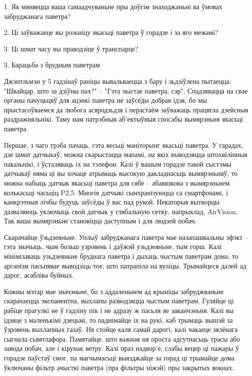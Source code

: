 1. Як мяняецца ваша самаадчуваньне пры доўгім знаходжаньні ва ўмовах забруджанага паветра?

2. Ці заўважаеце вы розьніцу якасьці паветра ў горадзе і за яго межамі?

3. Ці шмат часу вы праводзіце ў транспарце?


3. Барацьба з брудным паветрам

Джэнтльмэн у 5 гадзінаў раніцы вывальваецца з бару і зьдзіўлена пытаецца: "Швайцар, што за дзіўны пах?" – "Гэта чыстае паветра, сэр". Спадзявацца на свае органы пачуцьцяў для ацэнкі паветра не заўсёды добрая ідэя, бо мы прыстасоўваемся да любога асяродзьдзя і перастаём заўважаць працягла дзейсныя раздражняльнікі. Таму нам патрэбныя аб'ектыўныя спосабы вымярэньня якасьці паветра.

Першае, з чаго трэба пачаць, гэта весьці маніторынг якасьці паветра. У гарадах, дзе шмат датчыкаў, можна скарыстацца мапамі, на якіх выводзяцца штохвілінныя паказьнікі, і ўсталяваць іх на тэлефон. Калі ў вашым горадзе такой сыстэмы датчыкаў няма ці вы хочаце атрымаць высокую дакладнасьць вымярэньняў, то можна набыць датчык якасьці паветра для сябе – абавязкова з вымярэньнем колькасьці часьціц P2,5. Многія датчыкі сынхранізуюцца са смартфонамі, і канкрэтныя лічбы будуць заўсёды ў вас пад рукой. Некаторыя вытворцы дазваляюць уключыць свой датчык у глябальную сетку, напрыклад, AirVision. Так ваша вымярэньне становіцца даступным і для людзей побач.

Скарачайце ўзьдзеяньне. Уплыў забруджанага паветра мае назапашвальны эфэкт – гэта значыць, чым больш узровень і даўжэй узьдзеяньне, тым горш. Калі мінімізаваць узьдзеяньне бруднага паветра і дыхаць чыстым паветрам дома, то арганізм пасьпявае выводзіць тое, што патрапіла на вуліцы. Трымайцеся далей ад дарог, асабліва буйных.

Кожны мэтар мае значэньне, бо з аддаленьнем ад крыніцы забруджваньне скарачаецца экспанентна, выхлапы разводзяцца чыстым паветрам. Гуляйце ці рабіце прагулкі не ў гадзіну пік і не адразу ж пасьля яе заканчэньня. Калі вы ідзяце з маленькімі дзецьмі, то паднімайце іх на рукі, каб трымаць вышэй за ўзровень выхлапных газаў. Ня стойце каля самай дарогі, калі чакаеце зялёнага сыгнала сьвятлафора. Памятайце, што важная ня проста адсутнасьць трасы або завода побач, але і кірунак ветру. Калі праз надвор'е, слабы вецер ці пажары ў горадзе паўстаў смог, па магчымасьці выязджайце за горад ці трымайце дома ўключаны фільтр ачысткі паветра (пра фільтры ніжэй) пры закрытых вокнах.

